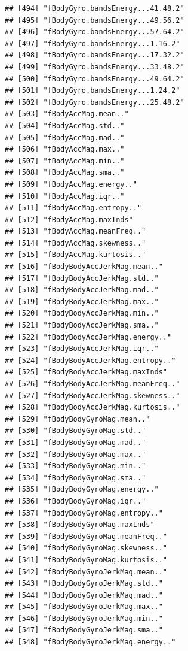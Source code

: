 \documentclass[
]{article}
\begin{document}
\begin{verbatim}
## [494] "fBodyGyro.bandsEnergy...41.48.2"     
## [495] "fBodyGyro.bandsEnergy...49.56.2"     
## [496] "fBodyGyro.bandsEnergy...57.64.2"     
## [497] "fBodyGyro.bandsEnergy...1.16.2"      
## [498] "fBodyGyro.bandsEnergy...17.32.2"     
## [499] "fBodyGyro.bandsEnergy...33.48.2"     
## [500] "fBodyGyro.bandsEnergy...49.64.2"     
## [501] "fBodyGyro.bandsEnergy...1.24.2"      
## [502] "fBodyGyro.bandsEnergy...25.48.2"     
## [503] "fBodyAccMag.mean.."                  
## [504] "fBodyAccMag.std.."                   
## [505] "fBodyAccMag.mad.."                   
## [506] "fBodyAccMag.max.."                   
## [507] "fBodyAccMag.min.."                   
## [508] "fBodyAccMag.sma.."                   
## [509] "fBodyAccMag.energy.."                
## [510] "fBodyAccMag.iqr.."                   
## [511] "fBodyAccMag.entropy.."               
## [512] "fBodyAccMag.maxInds"                 
## [513] "fBodyAccMag.meanFreq.."              
## [514] "fBodyAccMag.skewness.."              
## [515] "fBodyAccMag.kurtosis.."              
## [516] "fBodyBodyAccJerkMag.mean.."          
## [517] "fBodyBodyAccJerkMag.std.."           
## [518] "fBodyBodyAccJerkMag.mad.."           
## [519] "fBodyBodyAccJerkMag.max.."           
## [520] "fBodyBodyAccJerkMag.min.."           
## [521] "fBodyBodyAccJerkMag.sma.."           
## [522] "fBodyBodyAccJerkMag.energy.."        
## [523] "fBodyBodyAccJerkMag.iqr.."           
## [524] "fBodyBodyAccJerkMag.entropy.."       
## [525] "fBodyBodyAccJerkMag.maxInds"         
## [526] "fBodyBodyAccJerkMag.meanFreq.."      
## [527] "fBodyBodyAccJerkMag.skewness.."      
## [528] "fBodyBodyAccJerkMag.kurtosis.."      
## [529] "fBodyBodyGyroMag.mean.."             
## [530] "fBodyBodyGyroMag.std.."              
## [531] "fBodyBodyGyroMag.mad.."              
## [532] "fBodyBodyGyroMag.max.."              
## [533] "fBodyBodyGyroMag.min.."              
## [534] "fBodyBodyGyroMag.sma.."              
## [535] "fBodyBodyGyroMag.energy.."           
## [536] "fBodyBodyGyroMag.iqr.."              
## [537] "fBodyBodyGyroMag.entropy.."          
## [538] "fBodyBodyGyroMag.maxInds"            
## [539] "fBodyBodyGyroMag.meanFreq.."         
## [540] "fBodyBodyGyroMag.skewness.."         
## [541] "fBodyBodyGyroMag.kurtosis.."         
## [542] "fBodyBodyGyroJerkMag.mean.."         
## [543] "fBodyBodyGyroJerkMag.std.."          
## [544] "fBodyBodyGyroJerkMag.mad.."          
## [545] "fBodyBodyGyroJerkMag.max.."          
## [546] "fBodyBodyGyroJerkMag.min.."          
## [547] "fBodyBodyGyroJerkMag.sma.."          
## [548] "fBodyBodyGyroJerkMag.energy.."       

\end{verbatim}
\end{document}
